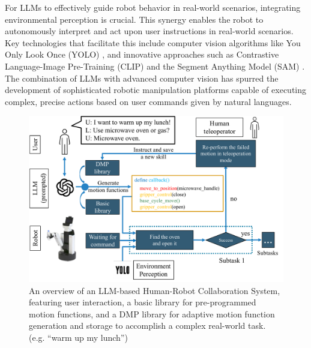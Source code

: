 \documentclass[letterpaper,conference]{ieeeconf}
\begin{document}
For LLMs to effectively guide robot behavior in real-world scenarios, integrating environmental perception is crucial. This synergy enables the robot to autonomously interpret and act upon user instructions in real-world scenarios. Key technologies that facilitate this include computer vision algorithms like You Only Look Once (YOLO) \cite{redmon2016look}, and innovative approaches such as Contrastive Language-Image Pre-Training (CLIP) \cite{radford2021learning} and the Segment Anything Model (SAM) \cite{kirillov2023segment}. The combination of LLMs with advanced computer vision has spurred the development of sophisticated robotic manipulation platforms capable of executing complex, precise actions based on user commands given by natural languages.
 \begin{figure}[t]
    \centering
    \includegraphics[width=0.87\linewidth]{archi.pdf}
    \captionsetup{skip=0pt}
    \caption{An overview of an LLM-based Human-Robot Collaboration System, featuring user interaction, a basic library for pre-programmed motion functions, and a DMP library for adaptive motion function generation and storage to accomplish a complex real-world task. (e.g. ``warm up my lunch'')}
    \label{fig:system}
 \vspace{-6mm}
\end{figure}

\end{document}
